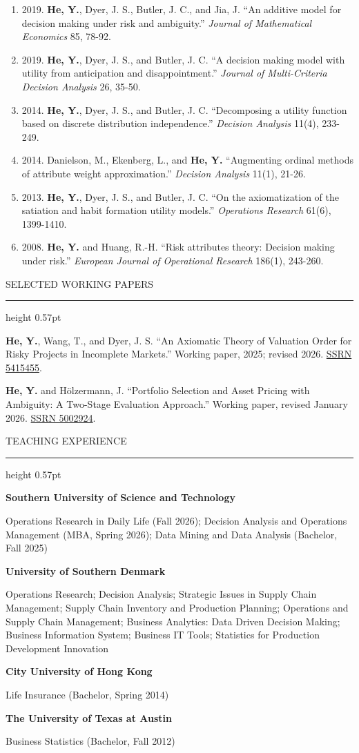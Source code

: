 \documentclass[10pt,a4paper]{article}
\newcommand{\cvsection}[1]{%
  \par\addvspace{8.1pt}\needspace{3\baselineskip}%
  {\headingfont\fontsize{10.35}{12}\selectfont\color{navy}\MakeUppercase{#1}}\par\vspace{3.4pt}%
  {\color{ruleblue}\hrule height 0.57pt}\vspace{5pt}%
}
\newcommand{\cvteaching}[2]{%
  \par\noindent\begin{minipage}[t]{2.28in}\raggedright\vspace*{-7pt}\metafont\fontsize{8.55}{11.6}\selectfont\color{slate}\textbf{#1}\end{minipage}%
  \hspace{0.11in}%
  \begin{minipage}[t]{\dimexpr\linewidth-2.28in-0.11in\relax}\raggedright #2\end{minipage}%
  \par\vspace{2.4pt}%
}
\newcommand{\cvitem}[1]{%
 \par\noindent\hangindent=12.5pt\hangafter=1%
 {\makebox[12.5pt][l]{\color{accent}\fontsize{6}{8}\selectfont\raisebox{1.2pt}{\textbullet}}}#1\par\vspace{1.7pt}%
}
\begin{document}
\begin{enumerate}
\item 2019. \textbf{He, Y.}, Dyer, J. S., Butler, J. C., and Jia, J. “An additive model for decision making under risk and ambiguity.” \textit{Journal of Mathematical Economics} 85, 78-92.
\item 2019. \textbf{He, Y.}, Dyer, J. S., and Butler, J. C. “A decision making model with utility from anticipation and disappointment.” \textit{Journal of Multi-Criteria Decision Analysis} 26, 35-50.
\item 2014. \textbf{He, Y.}, Dyer, J. S., and Butler, J. C. “Decomposing a utility function based on discrete distribution independence.” \textit{Decision Analysis} 11(4), 233-249.
\item 2014. Danielson, M., Ekenberg, L., and \textbf{He, Y.} “Augmenting ordinal methods of attribute weight approximation.” \textit{Decision Analysis} 11(1), 21-26.
\item 2013. \textbf{He, Y.}, Dyer, J. S., and Butler, J. C. “On the axiomatization of the satiation and habit formation utility models.” \textit{Operations Research} 61(6), 1399-1410.
\item 2008. \textbf{He, Y.} and Huang, R.-H. “Risk attributes theory: Decision making under risk.” \textit{European Journal of Operational Research} 186(1), 243-260.
\end{enumerate}
\cvsection{Selected Working Papers}
\cvitem{\textbf{He, Y.}, Wang, T., and Dyer, J. S. “An Axiomatic Theory of Valuation Order for Risky Projects in Incomplete Markets.” Working paper, 2025; revised 2026. \href{https://papers.ssrn.com/sol3/papers.cfm?abstract_id=5415455}{SSRN 5415455}.}
\cvitem{\textbf{He, Y.} and Hölzermann, J. “Portfolio Selection and Asset Pricing with Ambiguity: A Two-Stage Evaluation Approach.” Working paper, revised January 2026. \href{https://papers.ssrn.com/sol3/papers.cfm?abstract_id=5002924}{SSRN 5002924}.}
\cvsection{Teaching Experience}
\cvteaching{Southern University of Science and Technology}{Operations Research in Daily Life (Fall 2026); Decision Analysis and Operations Management (MBA, Spring 2026); Data Mining and Data Analysis (Bachelor, Fall 2025)}
\cvteaching{University of Southern Denmark}{Operations Research; Decision Analysis; Strategic Issues in Supply Chain Management; Supply Chain Inventory and Production Planning; Operations and Supply Chain Management; Business Analytics: Data Driven Decision Making; Business Information System; Business IT Tools; Statistics for Production Development Innovation}
\cvteaching{City University of Hong Kong}{Life Insurance (Bachelor, Spring 2014)}
\cvteaching{The University of Texas at Austin}{Business Statistics (Bachelor, Fall 2012)}
\end{document}
